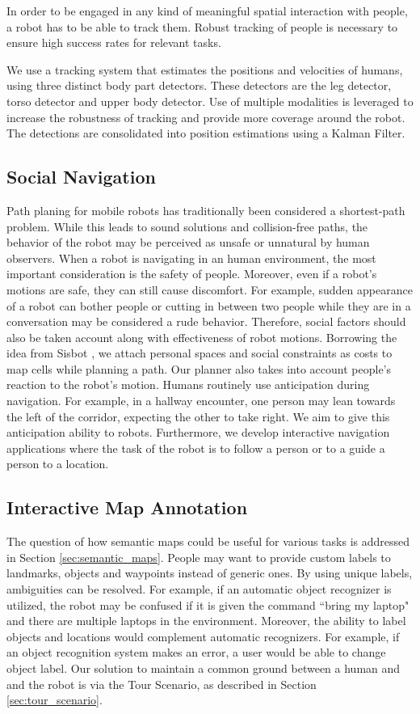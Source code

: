 In order to be engaged in any kind of meaningful spatial interaction with people, a robot has to be able to track them. Robust tracking of people is necessary to ensure high success rates for relevant tasks.

We use a tracking system that estimates the positions and velocities of humans, using three distinct body part detectors. These detectors are the leg detector, torso detector and upper body detector. Use of multiple modalities is leveraged to increase the robustness of tracking and provide more coverage around the robot. The detections are consolidated into position estimations using a Kalman Filter.

\subsection{Social Navigation}

Path planing for mobile robots has traditionally been considered a shortest-path problem. While this leads to sound solutions and collision-free paths, the behavior of the robot may be perceived as unsafe or unnatural by human observers. When a robot is navigating in an human environment, the most important consideration is the safety of people. Moreover, even if a robot's motions are safe, they can still cause discomfort. For example, sudden appearance of a robot can bother people or cutting in between two people while they are in a conversation may be considered a rude behavior. Therefore, social factors should also be taken account along with effectiveness of robot motions. Borrowing the idea from Sisbot \cite{sisbot2007human}, we attach personal spaces and social constraints as costs to map cells while planning a path. Our planner also takes into account people's reaction to the robot's motion. Humans routinely use anticipation during navigation. For example, in a hallway encounter, one person may lean towards the left of the corridor, expecting the other to take right. We aim to give this anticipation ability to robots. Furthermore, we develop interactive navigation applications where the task of the robot is to follow a person or to a guide a person to a location.

\subsection{Interactive Map Annotation}

The question of how semantic maps could be useful for various tasks is addressed in Section \ref{sec:semantic_maps}. People may want to provide custom labels to landmarks, objects and waypoints instead of generic ones. By using unique labels, ambiguities can be resolved. For example, if an automatic object recognizer is utilized, the robot may be confused if it is given the command ``bring my laptop" and there are multiple laptops in the environment. Moreover, the ability to label objects and locations would complement automatic recognizers. For example, if an object recognition system makes an error, a user would be able to change object label. Our solution to maintain a common ground between a human and and the robot is via the Tour Scenario, as described in Section \ref{sec:tour_scenario}.

